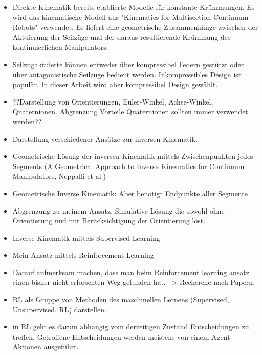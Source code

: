 \begin{itemize}

\item Direkte Kinematik bereits etablierte Modelle für konstante Krümmungen. Es wird das kinematische Modell aus "Kinematics for Multisection Continuum Robots" verwendet. Es liefert eine geometrische Zusammenhänge zwischen der Aktuierung der Seilzüge und der daraus resultierende Krümmung des kontinuierlichen Manipulators.

\item Seilzugaktuierte können entweder über kompressibel Federn gestützt oder über antagonistische Seilzüge bedient werden. Inkompressibles Design ist populär. In dieser Arbeit wird aber kompressibel Design gewählt.

\item ??Darstellung von Orientierungen, Euler-Winkel, Achse-Winkel, Quaternionen. Abgrenzung Vorteile Quaternionen sollten immer verwendet werden??

\item Darstellung verschiedener Ansätze zur inversen Kinematik. 

\item Geometrische Lösung der inversen Kinematik mittels Zwischenpunkten jedes Segments (A Geometrical Approach to Inverse Kinematics for Continuum Manipulators, Neppalli et al.) \cite{NCJW09}

\item Geometrische Inverse Kinematik: Aber benötigt Endpunkte aller Segmente

\item Abgrenzung zu meinem Ansatz. Simulative Lösung die sowohl ohne Orientierung nud mit Berücksichtigung der Orientierung löst. 

\item Inverse Kinematik mittels Supervised Learning

\item Mein Ansatz mittels Reinforcement Learning

\item Darauf aufmerksam machen, dass man beim Reinforcement learning ansatz einen bisher nicht erforschten Weg gefunden hat. --> Recherche nach Papern. 

\item RL als Gruppe von Methoden des maschinellen Lernens (Supervised, Unsupervised, RL) darstellen. 

\item in RL geht es darum abhängig vom derzeitigen Zustand Entscheidungen zu treffen. Getroffene Entscheidungen werden meistens von einem Agent Aktionen ausgeführt.


\end{itemize}
